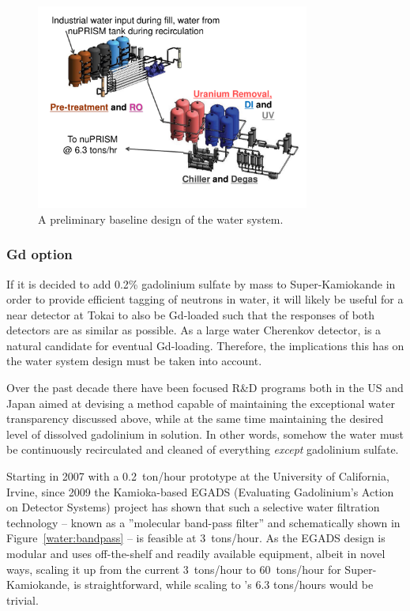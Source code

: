 \begin{figure}[htpb]
     \begin{center}
       \includegraphics[width=9cm]{figures/nuPRISM_water.pdf}
       \caption{A preliminary baseline design of the \nuprism water system.}
       \label{water:water}
     \end{center}
\end{figure}


\subsubsection{Gd option}

If it is decided to add 0.2\% gadolinium sulfate by mass to 
Super-Kamiokande in order to provide efficient tagging 
of neutrons in water, it will likely be useful for a near detector at Tokai to also be 
Gd-loaded such that the responses of both detectors are as similar as possible.  As a large 
water Cherenkov detector, \nuprism is a natural candidate for eventual Gd-loading.  Therefore, 
the implications this has on the water system design must be taken into account.

Over the past decade there have been focused R\&D programs both in the US and Japan aimed 
at devising a method capable of maintaining the exceptional water transparency discussed 
above, while at the same time maintaining the desired level of dissolved gadolinium in solution.  
In other words, somehow the water must be continuously recirculated and cleaned of 
everything {\em except} gadolinium sulfate.

Starting in 2007 with a 0.2~ton/hour prototype at the University of California, Irvine, since 2009 
the Kamioka-based EGADS (Evaluating Gadolinium's Action on Detector Systems) project 
has shown that such a selective water filtration technology -- known as a ''molecular band-pass
filter''  and schematically shown in  Figure~\ref{water:bandpass} -- is feasible at  3~tons/hour.  
As the EGADS design is modular and uses off-the-shelf and readily available equipment, albeit 
in novel ways, scaling it up from the current 3~tons/hour to 60~tons/hour for Super-Kamiokande, 
is straightforward, while scaling to \nuprism's 6.3 tons/hours would be trivial.

